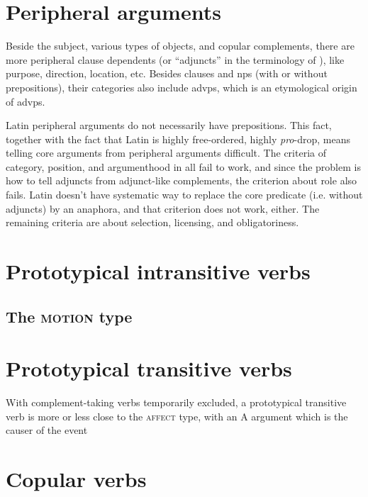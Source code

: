 \documentclass[a4paper, oneside]{report}
\newcommand*{\citesec}[1]{\S~{#1}}
\newcommand*{\term}[1]{\emph{#1}}
\newcommand{\classify}[1]{{\textsc{#1}}}
\begin{document}
\section{Peripheral arguments}

Beside the subject, various types of objects, and copular complements,
there are more peripheral clause dependents
(or ``adjuncts'' in the terminology of \citet{cgel}),
like purpose, direction, location, etc.
Besides clauses and \ac{np}s (with or without prepositions),
their categories also include \ac{advp}s,
which is an etymological origin of \ac{advp}s.

Latin peripheral arguments do not necessarily have prepositions.
This fact, together with the fact that Latin is highly free-ordered, 
highly \term{pro}-drop,
means telling core arguments from peripheral arguments difficult.
The criteria of category, position, and argumenthood in \citet[\citesec{4.1.2}]{cgel} 
all fail to work,
and since the problem is how to tell adjuncts from adjunct-like complements,
the criterion about role also fails.
Latin doesn't have systematic way to replace the core predicate (i.e. without adjuncts) by an anaphora,
and that criterion does not work, either.
The remaining criteria are about selection, licensing, and obligatoriness.

\subsection{}

\section{Prototypical intransitive verbs}\label{sec:prototypical-intransitive}

\subsection{The \classify{motion} type}


\section{Prototypical transitive verbs}\label{sec:prototypical-transitive}

With complement-taking verbs temporarily excluded,
a prototypical transitive verb is more or less close to the \classify{affect} type,
with an A argument which is the causer of the event 

\section{Copular verbs}
\end{document}

